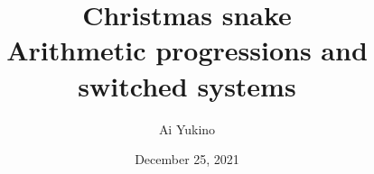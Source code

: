 \documentclass{article}
\theoremstyle{definition} %
\theoremstyle{plain} %
\theoremstyle{remark} %
\numberwithin{equation}{section}
\begin{document}
\title{Christmas snake\\
	\large Arithmetic progressions and switched systems}
\author{Ai Yukino}
\date{December 25, 2021}
\maketitle
\hypersetup{linkcolor = internallinkcolor}
\hypersetup{linkcolor= .}
\end{document}
